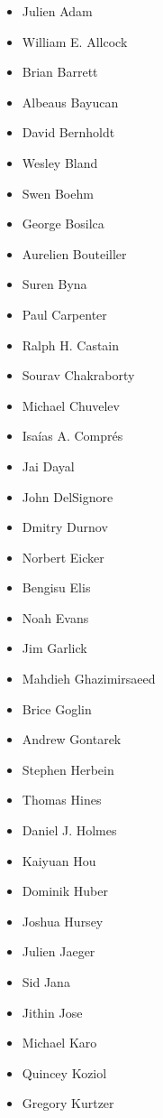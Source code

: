 \begin{itemize}
    \item Julien Adam %
    \item William E. Allcock
    \item Brian Barrett
    \item Albeaus Bayucan
    \item David Bernholdt
    \item Wesley Bland
    \item Swen Boehm
    \item George Bosilca
    \item Aurelien Bouteiller
    \item Suren Byna
    \item Paul Carpenter
    \item Ralph H. Castain
    \item Sourav Chakraborty
    \item Michael Chuvelev
    \item Isaías A. Comprés
    \item Jai Dayal
    \item John DelSignore
    \item Dmitry Durnov
    \item Norbert Eicker
    \item Bengisu Elis
    \item Noah Evans
    \item Jim Garlick
    \item Mahdieh Ghazimirsaeed
    \item Brice Goglin
    \item Andrew Gontarek
    \item Stephen Herbein
    \item Thomas Hines
    \item Daniel J. Holmes
    \item Kaiyuan Hou
    \item Dominik Huber
    \item Joshua Hursey
    \item Julien Jaeger
    \item Sid Jana
    \item Jithin Jose
    \item Michael Karo
    \item Quincey Koziol
    \item Gregory Kurtzer

\end{itemize}
